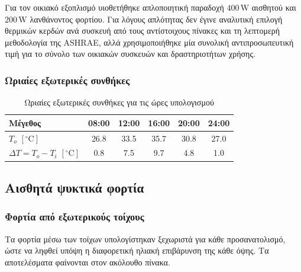 \documentclass[12pt,a4paper]{article}
\begin{document}
Για τον οικιακό εξοπλισμό υιοθετήθηκε απλοποιητική παραδοχή
\(400\,\mathrm{W}\) αισθητού και \(200\,\mathrm{W}\) λανθάνοντος φορτίου.
Για λόγους απλότητας δεν έγινε αναλυτική επιλογή θερμικών κερδών ανά συσκευή
από τους αντίστοιχους πίνακες και τη λεπτομερή μεθοδολογία της ASHRAE, αλλά
χρησιμοποιήθηκε μία συνολική αντιπροσωπευτική τιμή για το σύνολο των οικιακών
συσκευών και δραστηριοτήτων χρήσης.

\subsubsection{Ωριαίες εξωτερικές συνθήκες}

\begin{table}[H]
\centering
\caption{Ωριαίες εξωτερικές συνθήκες για τις ώρες υπολογισμού}
\begin{tabular}{lccccc}
\toprule
\textbf{Μέγεθος} & \textbf{08:00} & \textbf{12:00} & \textbf{16:00} & \textbf{20:00} & \textbf{24:00} \\
\midrule
\(T_o\) \([\!^\circ\mathrm{C}]\) & 26.8 & 33.5 & 35.7 & 30.8 & 27.0 \\
\(\Delta T = T_o - T_i\) \([\!^\circ\mathrm{C}]\) & 0.8 & 7.5 & 9.7 & 4.8 & 1.0 \\
\bottomrule
\end{tabular}
\end{table}

\subsection{Αισθητά ψυκτικά φορτία}

\subsubsection{Φορτία από εξωτερικούς τοίχους}

Τα φορτία μέσω των τοίχων υπολογίστηκαν ξεχωριστά για κάθε προσανατολισμό, ώστε να
ληφθεί υπόψη η διαφορετική ηλιακή επιβάρυνση της κάθε όψης. Τα αποτελέσματα
φαίνονται στον ακόλουθο πίνακα.

\begin{table}[H]
\centering
\caption{Αισθητά φορτία από εξωτερικούς τοίχους}
\end{table}
\end{document}
